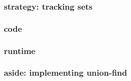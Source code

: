 

\subsubsection{strategy: tracking sets}



\subsubsection{code}



\subsubsection{runtime}



\subsubsection{aside: implementing union-find}



